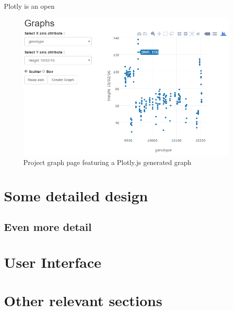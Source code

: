 Plotly is an open 

\cite{_plotly}

\begin{figure}[H]
    \centering
    \includegraphics[width=\textwidth]{images/design/plotly}
    \caption{Project graph page featuring a Plotly.js generated graph}
    \label{fig:plotly}
\end{figure} 


\section{Some detailed design}

\subsection{Even more detail}

\section{User Interface}

\section{Other relevant sections}